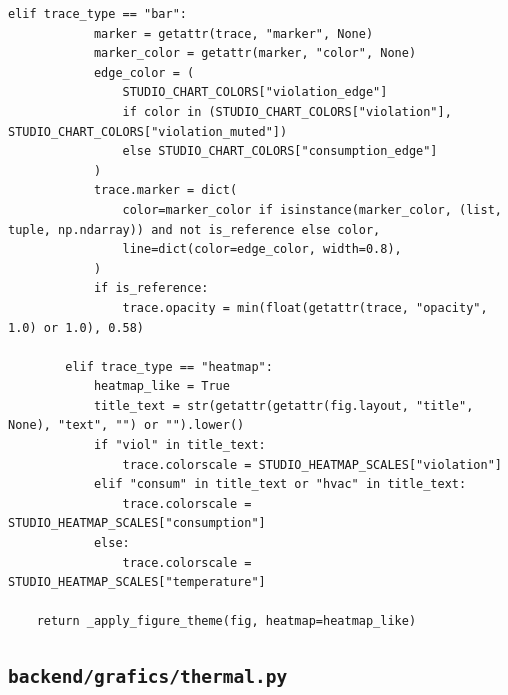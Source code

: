\documentclass[10pt,a4paper]{article}
\begin{document}
\begin{lstlisting}[style=studioPython,caption={backend/grafics/style.py},label={lst:backend-grafics-style-py}]
        elif trace_type == "bar":
            marker = getattr(trace, "marker", None)
            marker_color = getattr(marker, "color", None)
            edge_color = (
                STUDIO_CHART_COLORS["violation_edge"]
                if color in (STUDIO_CHART_COLORS["violation"], STUDIO_CHART_COLORS["violation_muted"])
                else STUDIO_CHART_COLORS["consumption_edge"]
            )
            trace.marker = dict(
                color=marker_color if isinstance(marker_color, (list, tuple, np.ndarray)) and not is_reference else color,
                line=dict(color=edge_color, width=0.8),
            )
            if is_reference:
                trace.opacity = min(float(getattr(trace, "opacity", 1.0) or 1.0), 0.58)

        elif trace_type == "heatmap":
            heatmap_like = True
            title_text = str(getattr(getattr(fig.layout, "title", None), "text", "") or "").lower()
            if "viol" in title_text:
                trace.colorscale = STUDIO_HEATMAP_SCALES["violation"]
            elif "consum" in title_text or "hvac" in title_text:
                trace.colorscale = STUDIO_HEATMAP_SCALES["consumption"]
            else:
                trace.colorscale = STUDIO_HEATMAP_SCALES["temperature"]

    return _apply_figure_theme(fig, heatmap=heatmap_like)
\end{lstlisting}


\subsection{\texorpdfstring{\texttt{backend/grafics/thermal.py}}{backend/grafics/thermal.py}}
\end{document}
